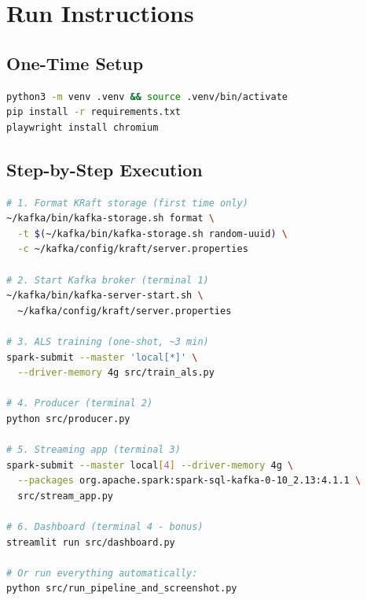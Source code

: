\documentclass[12pt,a4paper]{article}
\begin{document}
\section{Run Instructions}

\subsection{One-Time Setup}
\begin{lstlisting}[language=bash]
python3 -m venv .venv && source .venv/bin/activate
pip install -r requirements.txt
playwright install chromium
\end{lstlisting}

\subsection{Step-by-Step Execution}
\begin{lstlisting}[language=bash]
# 1. Format KRaft storage (first time only)
~/kafka/bin/kafka-storage.sh format \
  -t $(~/kafka/bin/kafka-storage.sh random-uuid) \
  -c ~/kafka/config/kraft/server.properties

# 2. Start Kafka broker (terminal 1)
~/kafka/bin/kafka-server-start.sh \
  ~/kafka/config/kraft/server.properties

# 3. ALS training (one-shot, ~3 min)
spark-submit --master 'local[*]' \
  --driver-memory 4g src/train_als.py

# 4. Producer (terminal 2)
python src/producer.py

# 5. Streaming app (terminal 3)
spark-submit --master local[4] --driver-memory 4g \
  --packages org.apache.spark:spark-sql-kafka-0-10_2.13:4.1.1 \
  src/stream_app.py

# 6. Dashboard (terminal 4 - bonus)
streamlit run src/dashboard.py

# Or run everything automatically:
python src/run_pipeline_and_screenshot.py
\end{lstlisting}
\end{document}
